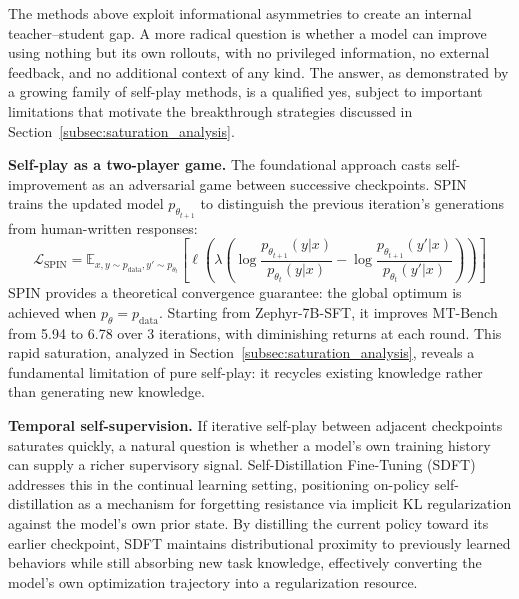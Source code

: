 \documentclass{article} %
\newcommand{\ptheta}{p_\theta}
\begin{document}
The methods above exploit informational asymmetries to create an internal teacher--student gap. A more radical question is whether a model can improve using nothing but its own rollouts, with no privileged information, no external feedback, and no additional context of any kind. The answer, as demonstrated by a growing family of self-play methods, is a qualified yes, subject to important limitations that motivate the breakthrough strategies discussed in Section~\ref{subsec:saturation_analysis}.

\textbf{Self-play as a two-player game.}
The foundational approach casts self-improvement as an adversarial game between successive checkpoints. SPIN~\citep{2401.01335} trains the updated model $p_{\theta_{t+1}}$ to distinguish the previous iteration's generations from human-written responses:
\begin{equation}
    \mathcal{L}_{\text{SPIN}} = \mathbb{E}_{x, y \sim p_{\text{data}}, y' \sim p_{\theta_t}} \left[ \ell\!\left( \lambda\left(\log \frac{p_{\theta_{t+1}}(y|x)}{p_{\theta_t}(y|x)} - \log \frac{p_{\theta_{t+1}}(y'|x)}{p_{\theta_t}(y'|x)}\right) \right) \right]
\end{equation}
SPIN provides a theoretical convergence guarantee: the global optimum is achieved when $\ptheta = p_{\text{data}}$. Starting from Zephyr-7B-SFT, it improves MT-Bench from 5.94 to 6.78 over 3 iterations, with diminishing returns at each round. This rapid saturation, analyzed in Section~\ref{subsec:saturation_analysis}, reveals a fundamental limitation of pure self-play: it recycles existing knowledge rather than generating new knowledge.

\textbf{Temporal self-supervision.}
If iterative self-play between adjacent checkpoints saturates quickly, a natural question is whether a model's own training history can supply a richer supervisory signal. Self-Distillation Fine-Tuning (SDFT)~\citep{2601.19897} addresses this in the continual learning setting, positioning on-policy self-distillation as a mechanism for forgetting resistance via implicit KL regularization against the model's own prior state. By distilling the current policy toward its earlier checkpoint, SDFT maintains distributional proximity to previously learned behaviors while still absorbing new task knowledge, effectively converting the model's own optimization trajectory into a regularization resource.
\end{document}
